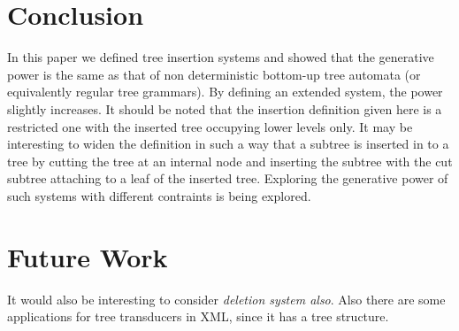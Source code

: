 \section{Conclusion}
In this paper we defined tree insertion systems and showed that the generative power is the same as that of non deterministic
bottom-up tree automata (or equivalently regular tree grammars). By defining an extended system, the power slightly increases. 
It should be noted that the insertion definition given here is a restricted one with the inserted tree occupying lower levels only.
It may be interesting to widen the definition in such a way that a subtree is inserted in to a tree by cutting the tree at an internal node 
and inserting the subtree with the cut subtree attaching to a leaf of the inserted tree. Exploring the generative power of  such systems with different
contraints is being explored. 
\section{Future Work}

It would also be interesting to consider \emph{deletion system also}.
Also there are some applications for tree transducers in XML, since it has a tree structure.
  



